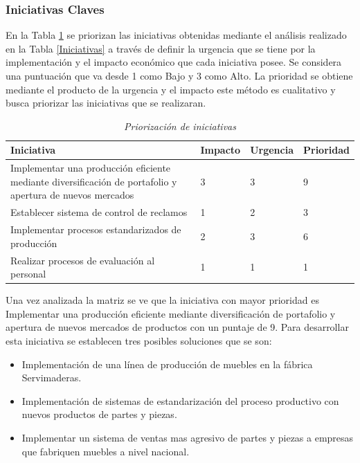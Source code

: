 \documentclass[12pt, a4paper]{article}
\begin{document}
\subsubsection{Iniciativas Claves}
En la  Tabla \ref{Priorizacion:Iniciativas} se priorizan las iniciativas obtenidas mediante el análisis realizado en la Tabla \ref{Iniciativas} a través de definir la urgencia que se tiene por la implementación y el impacto económico que cada iniciativa posee. Se considera una puntuación que va desde 1 como Bajo y 3 como Alto. La prioridad se obtiene mediante el producto de la urgencia y el impacto este método es cualitativo y busca priorizar las iniciativas que se realizaran.

\begin{table}[H]
\centering
\caption{\textit{ Priorización de iniciativas} }
\label{Priorizacion:Iniciativas}
\begin{tabular}{|p{5cm}|l|l|l|}
\hline
\textbf{Iniciativa} & \textbf{Impacto} & \textbf{Urgencia} & \textbf{Prioridad} \\ \hline
Implementar una producción eficiente mediante diversificación de portafolio y apertura de nuevos mercados & 3 & 3 & 9 \\ \hline
Establecer sistema de control de reclamos & 1 & 2 & 3 \\ \hline
Implementar procesos estandarizados de producción & 2 & 3 & 6 \\ \hline
Realizar procesos de evaluación al personal & 1 & 1 & 1 \\ \hline
\end{tabular}
\end{table}

Una vez analizada la matriz se ve que la iniciativa con mayor  prioridad es Implementar una producción eficiente mediante diversificación de portafolio y apertura de nuevos mercados de productos con un puntaje de 9. Para desarrollar esta iniciativa se establecen tres posibles soluciones que se son:

\begin{itemize}
\item Implementación de una línea de producción de muebles en la fábrica Servimaderas.
\item Implementación de sistemas de estandarización del proceso productivo con nuevos productos de partes y piezas.
\item Implementar un sistema de ventas mas agresivo de partes y piezas a empresas que fabriquen muebles a nivel nacional.
\end{itemize}
\end{document}
